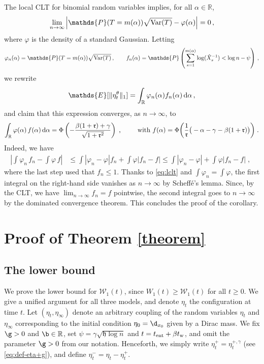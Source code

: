 \documentclass[11pt,reqno]{amsart}
\theoremstyle{remark}
\theoremstyle{definition}
\numberwithin{equation}{section}
\numberwithin{figure}{section}
\newcommand{\E}{\mathds{E}}
\renewcommand{\P}{\mathds{P}}
\newcommand{\R}{\mathbb{R}}
\newcommand{\dd}{{\rm d}}
\newcommand{\fstop}{\; \text{.}}
\newcommand{\comma}{\; \text{,}\;\;}
\newcommand{\abs}[1]{\left\lvert#1\right\rvert}
\newcommand{\var}{{\rm Var}}
\newcommand{\cW}{\ensuremath{\mathcal W}}
\begin{document}
	The local CLT for binomial random variables  implies, for all $\alpha \in \R$,
		\begin{equation}\label{eq:lclt}
			\lim_{n\to\infty}\left|\P(T=m(\alpha))\sqrt{\var(T)}-\varphi(\alpha)\right|=0\,,
		\end{equation}
		where $\varphi$ is the density of a standard Gaussian. 
			Letting 
			\begin{equation}
				\varphi_n(\alpha)=\P(T=m(\alpha))\sqrt{\var(T)}\,,\qquad f_n(\alpha)=\P\left(\sum_{s=1}^{m(\alpha)}\log(\hat X_s^{-1})<\log n-\psi \right)\,,
			\end{equation}
we rewrite
		\begin{equation}
			\E[\|\eta^\theta_t\|_1]
			=\int_{\R}\varphi_n(\alpha)f_n(\alpha)\,{\rm d}\alpha\, ,
	\end{equation}
	and claim that this expression converges, as $n\to \infty$, to
	\begin{equation}
		\int_\R \varphi(\alpha)\, f(\alpha)\, \dd \alpha = \Phi\left(-\frac{\beta(1+\mathfrak{r})+\gamma}{\sqrt{1+\mathfrak{r}^2}}\right) \comma\qquad \text{with}\ f(\alpha)= \Phi\bigg(\frac{1}{\mathfrak r}\big(-\alpha-\gamma-\beta(1+\mathfrak r) \big) \bigg) \fstop
	\end{equation}
	Indeed, we have
	\begin{align}
		\left|\int \varphi_n\, f_n - \int \varphi\, f \right|&\le \int \abs{\varphi_n-\varphi}f_n + \int \varphi\abs{f_n-f}\le \int \abs{\varphi_n-\varphi} + \int \varphi \abs{f_n-f}\comma
	\end{align}
	where the last step used that $f_n\le 1$.
		Thanks to \eqref{eq:lclt} and   $\int\varphi_n= \int\varphi$, the first integral on the right-hand side vanishes as $n\to \infty$ by Scheff\'{e}'s lemma. Since, by the CLT, we have $\lim_{n\to \infty}f_n=f$ pointwise,  the second integral goes to $n\to \infty$ by the dominated convergence theorem. This concludes the proof of the corollary.
	
	\section{Proof of Theorem \ref{theorem}}\label{sec:proofs}
	\subsection{The lower bound}
We prove the lower bound for $\cW_1(t)$, since  $W_1(t)\ge \cW_1(t)$ for all $t\ge 0$.
We give a unified argument for all three models, and denote $\eta_t$ the configuration at time $t$.  
Let $(\eta_t,\eta_\infty)$ denote an arbitrary coupling of the random variables $\eta_t$ and $\eta_\infty$ corresponding to the initial condition $\eta_0 = \d_{x_0}$ given by a Dirac mass. 
We fix $\g>0$ and $\b\in \R$, set $\psi =\gamma \sqrt{\mathfrak h\log n}$ and $t=t_{\rm ent}+\beta t_{\rm w}$, and omit the parameter $\g>0$ from our notation. Henceforth, we simply write $\eta_t^+=\eta_t^{+,\gamma}$  (see \eqref{eq:def-eta+g}), and define $\eta_t^-=\eta_t-\eta_t^+$.
\end{document}
